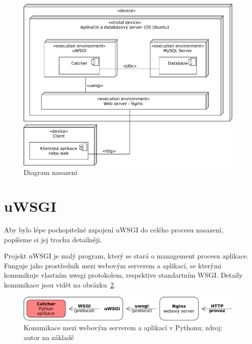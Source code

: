 \begin{figure}[ht!]
\centering
\includegraphics[width=130mm]{./images/diagram-nasazeni.pdf}
\caption{Diagram nasazení\label{overflow}}
\end{figure}

\section{uWSGI}

\indent

Aby bylo lépe pochopitelné zapojení uWSGI do celého procesu nasazení, popíšeme si jej trochu detailněji.

\medskip

Projekt uWSGI je malý program, který se stará o management procesu aplikace.
Funguje jako prostředník mezi webovým serverem a aplikací,
se kterými komunikuje vlastním uwsgi protokolem, respektive standartním WSGI.
Detaily komunikace jsou vidět na obrázku~\ref{fig:uwsgi}.

\begin{figure}[ht!]
\centering
\includegraphics[width=135mm]{./images/uwsgi.pdf}
\caption{Komunikace mezi webovým serverem a aplikací v Pythonu; zdroj: autor na základě~\cite{uwsgi}\label{overflow}}
\label{fig:uwsgi}
\end{figure}



